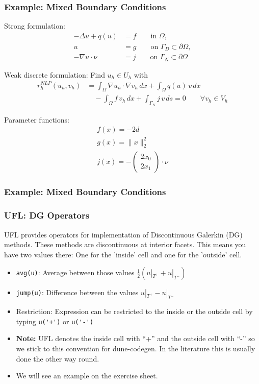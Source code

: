 \documentclass[aspectratio=169,11pt]{beamer}
\theoremstyle{definition}
\begin{document}
\begin{frame}
  \frametitle{Example: Mixed Boundary Conditions}
  \small

  Strong formulation:
  \begin{align*}
    -\Delta u + q(u) & = f \qquad\text{in $\Omega$}, \\
    u &= g \qquad\text{on $\Gamma_D\subset\partial\Omega$}, \\
    -\nabla u \cdot \nu &= j \qquad\text{on $\Gamma_N\subset\partial\Omega$}
  \end{align*}

  Weak discrete formulation: Find $u_h \in U_h$ with
  \begin{align*}
    r_h^{NLP}(u_h, v_h)
    & = \int_\Omega \nabla u_h \cdot \nabla v_h \, dx
      + \int_\Omega q(u) \, v \, dx \\
    &\quad - \int_\Omega f \, v_h \, dx
      + \int_{\Gamma_N} j \, v \, ds
      = 0 \qquad \forall v_h \in V_h
  \end{align*}

  Parameter functions:
  \begin{align*}
    f(x) = -2d \\
    g(x) = \| x \|_2^2\\
    j(x) = -
    \begin{pmatrix}
      2x_0 \\ 2x_1
    \end{pmatrix}
    \cdot \nu
  \end{align*}
\end{frame}

\begin{frame}
  \frametitle{Example: Mixed Boundary Conditions}
  
\end{frame}

\begin{frame}[fragile]
  \frametitle{UFL: DG Operators}

  UFL provides operators for implementation of Discontinuous Galerkin (DG)
  methods. These methods are discontinuous at interior facets. This means you
  have two values there: One for the 'inside' cell and one for the 'outside'
  cell.
  \begin{itemize}
  \item \lstinline{avg(u)}: Average between those values
    $\frac{1}{2}(u|_{T^+}+u|_{T^-})$
  \item \lstinline{jump(u)}: Difference between the values $u|_{T^+}-u|_{T^-}$
  \item Restriction: Expression can be restricted to the inside or the outside
    cell by typing \lstinline{u('+')} or \lstinline{u('-')}
  \item \textbf{Note:} UFL denotes the inside cell with ``+'' and the outside
    cell with ``-'' so we stick to this convention for dune-codegen. In the
    literature this is usually done the other way round.
  \item We will see an example on the exercise sheet.
  \end{itemize}
\end{frame}
\end{document}
